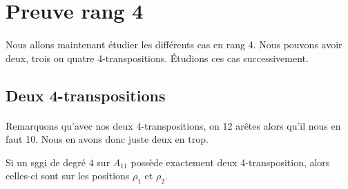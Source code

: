 \section{Preuve rang 4}

\paragraph{}
Nous allons maintenant étudier les différents cas en rang 4. Nous pouvons avoir deux, trois ou quatre 4-transpositions. Étudions ces cas successivement.

\subsection{Deux 4-transpositions}

\paragraph{}
Remarquons qu'avec nos deux 4-transpositions, on 12 arêtes alors qu'il nous en faut 10. Nous en avons donc juste deux en trop.

\begin{theorem}
  Si un sggi de degré $4$ sur $A_{11}$ possède exactement deux 4-transposition, alors celles-ci sont sur les positions $\rho_1$ et $\rho_2$.
\end{theorem}

